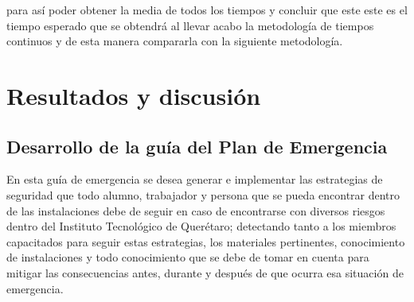         para así poder obtener la media de todos los tiempos y concluir que este este es el tiempo esperado que se obtendrá al llevar acabo la metodología de tiempos continuos y de esta manera compararla con la siguiente metodología.
     
    
    
    

    
    
    
    \section{Resultados y discusión}

    \subsection{Desarrollo de la guía del Plan de Emergencia}

    En esta guía de emergencia se desea generar e implementar las estrategias de seguridad que todo alumno, trabajador y  persona que se pueda encontrar dentro de las instalaciones debe de seguir en caso de encontrarse con diversos riesgos dentro del Instituto Tecnológico de Querétaro; detectando tanto a los miembros capacitados para seguir estas estrategias, los materiales pertinentes, conocimiento de instalaciones y todo conocimiento que se debe de tomar en cuenta para mitigar las consecuencias antes, durante y después de que ocurra esa situación de emergencia.
    
